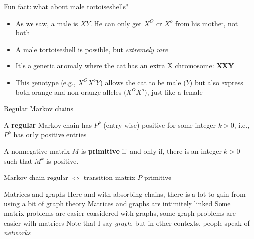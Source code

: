 \documentclass[aspectratio=169]{beamer}\usepackage[]{graphicx}\usepackage[]{xcolor}
\begin{document}
\begin{frame}{Fun fact: what about male tortoiseshells?}
    
    \begin{itemize}
        \item As we saw, a male is $XY$. He can only get $X^O$ or $X^o$ from his mother, not both
        \vfill
        
        \item A male tortoiseshell is possible, but \emph{extremely rare}
        
        \vfill
        
        \item It's a genetic anomaly where the cat has an extra X chromosome: \textbf{XXY}
        
        \vfill
        
        \item This genotype (e.g., $X^O X^o Y$) allows the cat to be male ($Y$) but also express both orange and non-orange alleles ($X^O X^o$), just like a female
    \end{itemize}
    
\end{frame}







\begin{frame}{Regular Markov chains}
\begin{definition}
A \textbf{regular} Markov chain has $P^k$ (entry-wise) positive for some integer $k>0$, i.e., $P^k$ has only positive entries
\end{definition}
\vfill
\begin{definition}
A nonnegative matrix $M$ is \textbf{primitive} if, and only if, there is an integer $k>0$ such that $M^k$ is positive.
\end{definition}
\vfill
\begin{theorem}
Markov chain regular $\iff$ transition matrix $P$ primitive
\end{theorem}
\end{frame}

\begin{frame}{Matrices and graphs}
Here and with absorbing chains, there is a lot to gain from using a bit of graph theory
\vfill
Matrices and graphs are intimitely linked 
\vfill
Some matrix problems are easier considered with graphs, some graph problems are easier with matrices
\vfill
Note that I say \emph{graph}, but in other contexts, people speak of \emph{networks}
\end{frame}
\end{document}
